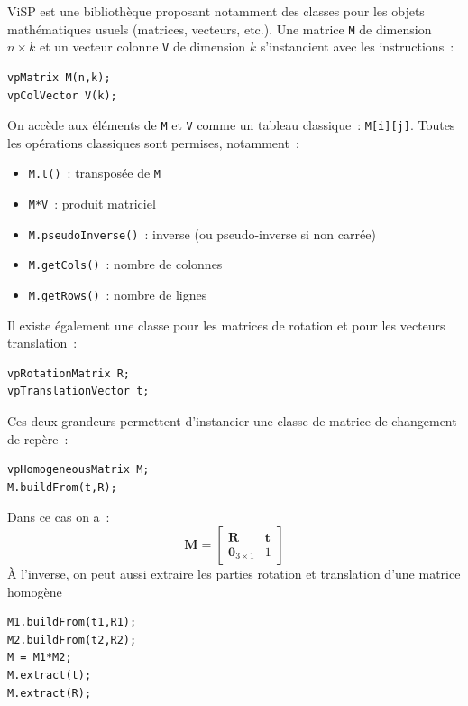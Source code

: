 \documentclass[12pt,a4paper]{article}
\begin{document}
ViSP est une bibliothèque proposant notamment des classes pour les objets mathématiques usuels (matrices, vecteurs, etc.).
Une matrice \texttt{M} de dimension $n\times k$ et un vecteur colonne \texttt{V} de dimension $k$ s'instancient avec les instructions~:
\begin{verbatim}
vpMatrix M(n,k);
vpColVector V(k);
\end{verbatim}
On accède aux éléments de \texttt{M} et \texttt{V} comme un tableau classique~: \texttt{M[i][j]}.
Toutes les opérations classiques sont permises, notamment~:
\begin{itemize}
\item \texttt{M.t()}~: transposée de \texttt{M}
\item \texttt{M*V}~: produit matriciel
\item \texttt{M.pseudoInverse()}~: inverse (ou pseudo-inverse si non carrée)
\item \texttt{M.getCols()}~: nombre de colonnes
\item \texttt{M.getRows()}~: nombre de lignes
\end{itemize}
Il existe également une classe pour les matrices de rotation et pour les vecteurs translation~:
\begin{verbatim}
vpRotationMatrix R;
vpTranslationVector t;
\end{verbatim}
Ces deux grandeurs permettent d'instancier une classe de matrice de changement de repère~:
\begin{verbatim}
vpHomogeneousMatrix M;
M.buildFrom(t,R);
\end{verbatim}Dans ce cas on a~:
\begin{equation*}
\mathbf{M} = \left[\begin{array}{cc}
                 \mathbf{R} & \mathbf{t} \\ \mathbf{0}_{3\times 1} & 1
                \end{array}\right]
\end{equation*}
À l'inverse, on peut aussi extraire les parties rotation et translation d'une matrice homogène
\begin{verbatim}
M1.buildFrom(t1,R1);
M2.buildFrom(t2,R2);
M = M1*M2;
M.extract(t);
M.extract(R);
\end{verbatim}
\end{document}
